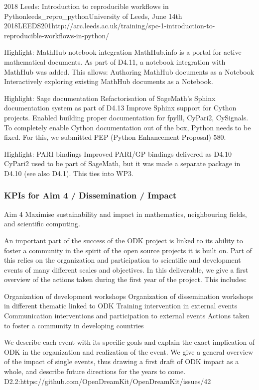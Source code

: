 \begin{Aim 1}
\begin{Aim 2}
\begin{event}{2018 Leeds: Introduction to reproducible workflows in Python}{leeds_repro_python}{University of Leeds, June 14th 
     2018}{LEEDS}{20}{1}{http://arc.leeds.ac.uk/training/spc-1-introduction-to-reproducible-workflows-in-python/}
\begin{itemize}
Highlight: MathHub notebook integration
MathHub.info is a portal for active mathematical documents. As part of D4.11, a notebook integration with MathHub was added. This allows:
Authoring MathHub documents as a Notebook Interactively exploring existing MathHub documents as a Notebook.

Highlight: Sage documentation
Refactorisation of SageMath’s Sphinx documentation system as part of D4.13
Improve Sphinx support for Cython projects.
Enabled building proper documentation for fpylll, CyPari2, CySignals.
To completely enable Cython documentation out of the box, Python needs to be fixed. For this, we submitted PEP (Python Enhancement Proposal) 580.

Highlight: PARI bindings
Improved PARI/GP bindings delivered as D4.10
CyPari2 used to be part of SageMath, but it was made a separate package in 
D4.10 (see also D4.1). This ties into WP3.



\subsubsection{KPIs for Aim 4 / Dissemination / Impact}

\begin{recommendation}{Aim 4}
  Maximise sustainability and impact in mathematics, neighbouring fields, and scientific computing.
\end{recommendation}



An important part of the success of the ODK project is linked to its ability to foster a community in the spirit of the open source projects it is built on. Part of this relies on the organization and participation to scientific and development events of many different scales and objectives. In this deliverable, we give a first overview of the actions taken during the first year of the project. This includes:

    Organization of development workshops
    Organization of dissemination workshops in different thematic linked to ODK
    Training intervention in external events
    Communication interventions and participation to external events
    Actions taken to foster a community in developing countries

We describe each event with its specific goals and explain the exact implication of ODK in the organization and realization of the event. We give a general overview of the impact of single events, thus drawing a first draft of ODK impact as a whole, and describe future directions for the years to come.
D2.2:https://github.com/OpenDreamKit/OpenDreamKit/issues/42





\end{itemize}
\end{event}
\end{Aim 2}
\end{Aim 1}
